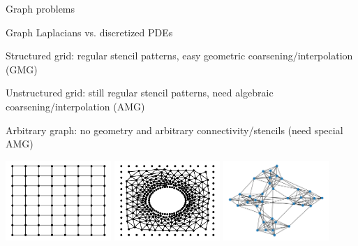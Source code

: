 \documentclass[18pt,xcolor=table]{beamer}
\begin{document}
\begin{frame}{Graph problems}
\begin{block}{Graph Laplacians vs. discretized PDEs}
\bit
\item Structured grid: regular stencil patterns, easy geometric coarsening/interpolation (GMG)
\item Unstructured grid: still regular stencil patterns, need algebraic coarsening/interpolation (AMG)
\item Arbitrary graph: no geometry and arbitrary connectivity/stencils (need special AMG)
\eit
\end{block}
\begin{center}
\includegraphics[width=0.3\textwidth]{../figures/structuredGrid}
\includegraphics[width=0.3\textwidth]{../figures/unstructuredGrid}
\includegraphics[width=0.3\textwidth]{../figures/graph}
\end{center}
\end{frame}
\end{document}
